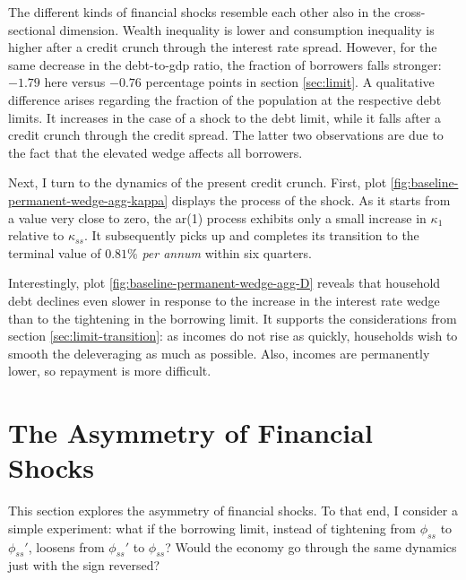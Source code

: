 \documentclass[12pt]{article} %
\numberwithin{equation}{section} %
\numberwithin{figure}{section}
\numberwithin{table}{section}
\begin{document}
The different kinds of financial shocks resemble each other also in the cross-sectional dimension. Wealth inequality is lower and consumption inequality is higher after a credit crunch through the interest rate spread. However, for the same decrease in the debt-to-\Gls{gdp} ratio, the fraction of borrowers falls stronger: $-1.79$ here versus $-0.76$ percentage points in section \ref{sec:limit}. A qualitative difference arises regarding the fraction of the population at the respective debt limits. It increases in the case of a shock to the debt limit, while it falls after a credit crunch through the credit spread. The latter two observations are due to the fact that the elevated wedge affects all borrowers.

Next, I turn to the dynamics of the present credit crunch. First, plot \ref{fig:baseline-permanent-wedge-agg-kappa} displays the process of the shock. As it starts from a value very close to zero, the \Gls{ar}(1) process exhibits only a small increase in $\kappa_1$ relative to $\kappa_{ss}$. It subsequently picks up and completes its transition to the terminal value of $0.81\%$ \textit{per annum} within six quarters.


Interestingly, plot \ref{fig:baseline-permanent-wedge-agg-D} reveals that household debt declines even slower in response to the increase in the interest rate wedge than to the tightening in the borrowing limit. It supports the considerations from section \ref{sec:limit-transition}: as incomes do not rise as quickly, households wish to smooth the deleveraging as much as possible. Also, incomes are permanently lower, so repayment is more difficult.

\section{The Asymmetry of Financial Shocks}
\label{sec:asymmetry}

This section explores the asymmetry of financial shocks. To that end, I consider a simple experiment: what if the borrowing limit, instead of tightening from $\phi_{ss}$ to $\phi_{ss}'$, loosens from $\phi_{ss}'$ to $\phi_{ss}$? Would the economy go through the same dynamics just with the sign reversed?
\end{document}
